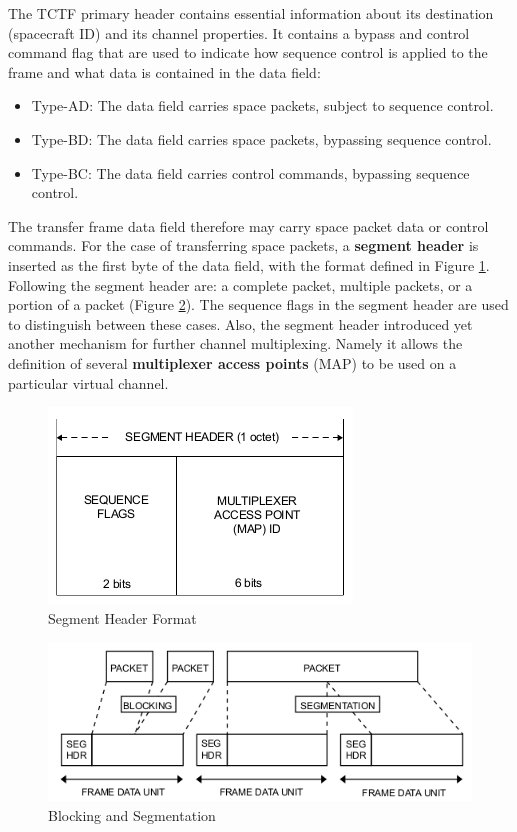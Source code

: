 The TCTF primary header contains essential information about its destination (spacecraft ID) and its channel properties. It contains a bypass and control command flag that are used to indicate how sequence control is applied to the frame and what data is contained in the data field:

\begin{itemize}
\item Type-AD: The data field carries space packets, subject to sequence control.
\item Type-BD: The data field carries space packets, bypassing sequence control.
\item Type-BC: The data field carries control commands, bypassing sequence control.
\end{itemize}
 
The transfer frame data field therefore may carry space packet data or control commands. For the case of transferring space packets, a \textbf{segment header} is inserted as the first byte of the data field, with the format defined in Figure \ref{fig:Segment Header Format}. Following the segment header are: a complete packet, multiple packets, or a portion of a packet (Figure \ref{fig:Blocking and Segmentation}). The sequence flags in the segment header are used to distinguish between these cases. Also, the segment header introduced yet another mechanism for further channel multiplexing. Namely it allows the definition of several \textbf{multiplexer access points} (MAP) to be used on a particular virtual channel.

\begin{figure}[h]
\centering\includegraphics[scale=0.6]{fig/segment_header_format}
\caption{Segment Header Format}
\label{fig:Segment Header Format}
\end{figure}

\begin{figure}[h]
\centering\includegraphics[scale=0.6]{fig/blocking_and_segmentation}
\caption{Blocking and Segmentation}
\label{fig:Blocking and Segmentation}
\end{figure}

